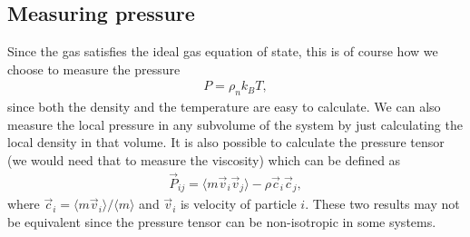 \subsection{Measuring pressure}
Since the gas satisfies the ideal gas equation of state, this is of course how we choose to measure the pressure
\begin{align}
	P = \rho_n k_BT,
\end{align}
since both the density and the temperature are easy to calculate. We can also measure the local pressure in any subvolume of the system by just calculating the local density in that volume. It is also possible to calculate the pressure tensor (we would need that to measure the viscosity\cite{alexander1998cell}) which can be defined as
\begin{align}
	\vec P_{ij} = \langle m\vec v_i \vec v_j \rangle - \rho \vec c_i \vec c_j,
\end{align}
where $\vec c_i = \langle m\vec v_i\rangle/\langle m \rangle$ and $\vec v_i$ is velocity of particle $i$. These two results may not be equivalent since the pressure tensor can be non-isotropic in some systems\cite{uribe1999burnett}. 
